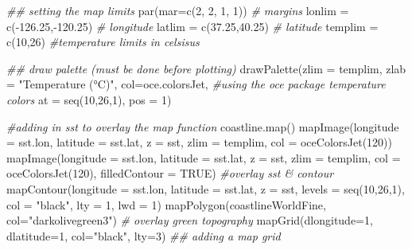 \documentclass[]{tufte-handout}
\newenvironment{Shaded}{}{}
\newcommand{\AttributeTok}[1]{\textcolor[rgb]{0.49,0.56,0.16}{#1}}
\newcommand{\CommentTok}[1]{\textcolor[rgb]{0.38,0.63,0.69}{\textit{#1}}}
\newcommand{\ConstantTok}[1]{\textcolor[rgb]{0.53,0.00,0.00}{#1}}
\newcommand{\DecValTok}[1]{\textcolor[rgb]{0.25,0.63,0.44}{#1}}
\newcommand{\DocumentationTok}[1]{\textcolor[rgb]{0.73,0.13,0.13}{\textit{#1}}}
\newcommand{\FloatTok}[1]{\textcolor[rgb]{0.25,0.63,0.44}{#1}}
\newcommand{\FunctionTok}[1]{\textcolor[rgb]{0.02,0.16,0.49}{#1}}
\newcommand{\NormalTok}[1]{#1}
\newcommand{\OtherTok}[1]{\textcolor[rgb]{0.00,0.44,0.13}{#1}}
\newcommand{\SpecialCharTok}[1]{\textcolor[rgb]{0.25,0.44,0.63}{#1}}
\newcommand{\StringTok}[1]{\textcolor[rgb]{0.25,0.44,0.63}{#1}}
\begin{document}
\begin{Shaded}
\begin{Highlighting}[]
\DocumentationTok{\#\# setting the map limits}
\FunctionTok{par}\NormalTok{(}\AttributeTok{mar=}\FunctionTok{c}\NormalTok{(}\DecValTok{2}\NormalTok{, }\DecValTok{2}\NormalTok{, }\DecValTok{1}\NormalTok{, }\DecValTok{1}\NormalTok{)) }\CommentTok{\# margins}
\NormalTok{lonlim }\OtherTok{=} \FunctionTok{c}\NormalTok{(}\SpecialCharTok{{-}}\FloatTok{126.25}\NormalTok{,}\SpecialCharTok{{-}}\FloatTok{120.25}\NormalTok{) }\CommentTok{\# longitude}
\NormalTok{latlim }\OtherTok{=} \FunctionTok{c}\NormalTok{(}\FloatTok{37.25}\NormalTok{,}\FloatTok{40.25}\NormalTok{) }\CommentTok{\# latitude }
\NormalTok{templim }\OtherTok{=} \FunctionTok{c}\NormalTok{(}\DecValTok{10}\NormalTok{,}\DecValTok{26}\NormalTok{) }\CommentTok{\#temperature limits in celsisus}

\DocumentationTok{\#\# draw palette (must be done before plotting)}
\FunctionTok{drawPalette}\NormalTok{(}\AttributeTok{zlim =}\NormalTok{ templim, }
            \AttributeTok{zlab =} \StringTok{"Temperature (°C)"}\NormalTok{,}
            \AttributeTok{col=}\NormalTok{oce.colorsJet, }\CommentTok{\#using the oce package temperature colors}
            \AttributeTok{at =} \FunctionTok{seq}\NormalTok{(}\DecValTok{10}\NormalTok{,}\DecValTok{26}\NormalTok{,}\DecValTok{1}\NormalTok{), }
            \AttributeTok{pos =} \DecValTok{1}\NormalTok{)}

\CommentTok{\#adding in sst to overlay the map function}
\FunctionTok{coastline.map}\NormalTok{()}
\FunctionTok{mapImage}\NormalTok{(}\AttributeTok{longitude =}\NormalTok{ sst.lon, }\AttributeTok{latitude =}\NormalTok{ sst.lat, }\AttributeTok{z =}\NormalTok{ sst, }\AttributeTok{zlim =}\NormalTok{ templim, }\AttributeTok{col =} \FunctionTok{oceColorsJet}\NormalTok{(}\DecValTok{120}\NormalTok{))}
\FunctionTok{mapImage}\NormalTok{(}\AttributeTok{longitude =}\NormalTok{ sst.lon, }\AttributeTok{latitude =}\NormalTok{ sst.lat, }\AttributeTok{z =}\NormalTok{ sst, }\AttributeTok{zlim =}\NormalTok{ templim, }\AttributeTok{col =} \FunctionTok{oceColorsJet}\NormalTok{(}\DecValTok{120}\NormalTok{), }\AttributeTok{filledContour =} \ConstantTok{TRUE}\NormalTok{)  }\CommentTok{\#overlay sst \& contour}
\FunctionTok{mapContour}\NormalTok{(}\AttributeTok{longitude =}\NormalTok{ sst.lon, }\AttributeTok{latitude =}\NormalTok{ sst.lat, }\AttributeTok{z =}\NormalTok{ sst, }\AttributeTok{levels =} \FunctionTok{seq}\NormalTok{(}\DecValTok{10}\NormalTok{,}\DecValTok{26}\NormalTok{,}\DecValTok{1}\NormalTok{),}
            \AttributeTok{col =} \StringTok{"black"}\NormalTok{, }\AttributeTok{lty =} \DecValTok{1}\NormalTok{, }\AttributeTok{lwd =} \DecValTok{1}\NormalTok{)}
\FunctionTok{mapPolygon}\NormalTok{(coastlineWorldFine, }\AttributeTok{col=}\StringTok{"darkolivegreen3"}\NormalTok{) }\CommentTok{\# overlay green topography}
\FunctionTok{mapGrid}\NormalTok{(}\AttributeTok{dlongitude=}\DecValTok{1}\NormalTok{, }\AttributeTok{dlatitude=}\DecValTok{1}\NormalTok{, }\AttributeTok{col=}\StringTok{"black"}\NormalTok{, }\AttributeTok{lty=}\DecValTok{3}\NormalTok{) }\DocumentationTok{\#\# adding a map grid}



\end{Highlighting}
\end{Shaded}
\end{document}
